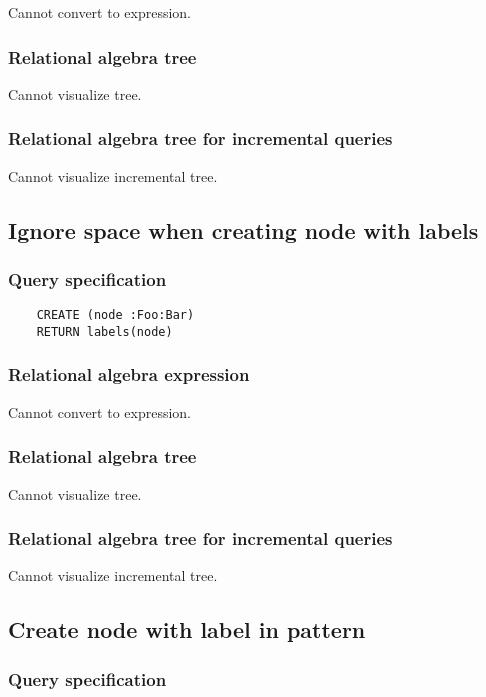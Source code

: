 	Cannot convert to expression.

	\subsubsection*{Relational algebra tree}

	Cannot visualize tree.

	\subsubsection*{Relational algebra tree for incremental queries}

	Cannot visualize incremental tree.
	\subsection{Ignore space when creating node with labels}

	\subsubsection*{Query specification}

	\begin{lstlisting}
	CREATE (node :Foo:Bar)
	RETURN labels(node)
	\end{lstlisting}


	\subsubsection*{Relational algebra expression}

	Cannot convert to expression.

	\subsubsection*{Relational algebra tree}

	Cannot visualize tree.

	\subsubsection*{Relational algebra tree for incremental queries}

	Cannot visualize incremental tree.
	\subsection{Create node with label in pattern}

	\subsubsection*{Query specification}

